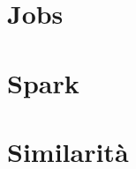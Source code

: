 \providecommand{\main}{.}







{\hypersetup{hidelinks}
	\tableofcontents  %
}

%

\chapter{Jobs}


\chapter{Spark}


\chapter{Similarità}


%

\appendix
%



